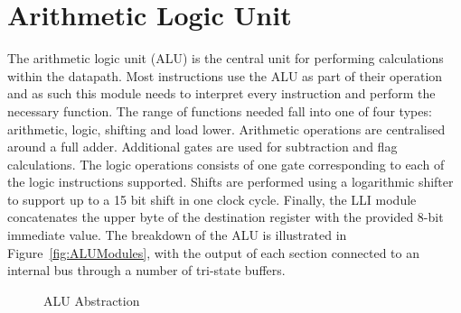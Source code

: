 

\section{Arithmetic Logic Unit}\label{sect:design:alu}

The arithmetic logic unit (ALU) is the central unit for performing calculations within the datapath. 
Most instructions use the ALU as part of their operation and as such this module needs to interpret every instruction and perform the necessary function. 
The range of functions needed fall into one of four types: arithmetic, logic, shifting and load lower. 
Arithmetic operations are centralised around a full adder.
Additional gates are used for subtraction and flag calculations. %
The logic operations consists of one gate corresponding to each of the logic instructions supported. 
Shifts are performed using a logarithmic shifter to support up to a 15 bit shift in one clock cycle. 
Finally, the LLI module concatenates the upper byte of the destination register with the provided 8-bit immediate value. 
The breakdown of the ALU is illustrated in Figure~\ref{fig:ALUModules}, with the output of each section connected to an internal bus through a number of tri-state buffers. 


\begin{figure}[h]
	\centering
	\caption{ALU Abstraction}
	\label{fig:ALUAbsract}
\end{figure}

